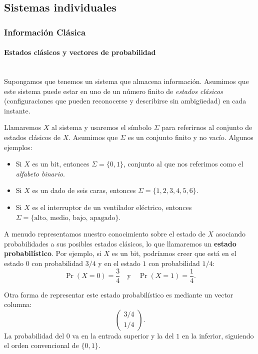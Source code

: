 \documentclass[12pt, a4paper]{article}
\begin{document}
\subsection{Sistemas individuales}
\subsubsection{Información Clásica}

\paragraph{Estados clásicos y vectores de probabilidad}\mbox{}\\

\noindent Supongamos que tenemos un sistema que almacena información. Asumimos que este sistema puede estar en uno de un número finito de \textit{estados clásicos} (configuraciones que pueden reconocerse y describirse sin ambigüedad) en cada instante.

\noindent Llamaremos $X$ al sistema y usaremos el símbolo $\Sigma$ para referirnos al conjunto de estados clásicos de $X$. Asumimos que $\Sigma$ es un conjunto finito y no vacío. Algunos ejemplos:
\begin{itemize}
    \item Si $X$ es un bit, entonces $\Sigma = \{0, 1\}$, conjunto al que nos referimos como el \textit{alfabeto binario}.
    \item Si $X$ es un dado de seis caras, entonces $\Sigma = \{1, 2, 3, 4, 5, 6\}$.
    \item Si $X$ es el interruptor de un ventilador eléctrico, entonces $\Sigma = \{\text{alto, medio, bajo, apagado}\}$.
\end{itemize}

\noindent A menudo representamos nuestro conocimiento sobre el estado de $X$ asociando probabilidades a sus posibles estados clásicos, lo que llamaremos un \textbf{estado probabilístico}. Por ejemplo, si $X$ es un bit, podríamos creer que está en el estado $0$ con probabilidad $3/4$ y en el estado $1$ con probabilidad $1/4$:
\[ \Pr(X = 0) = \frac{3}{4} \quad \text{y} \quad \Pr(X = 1) = \frac{1}{4}. \]

\noindent Otra forma de representar este estado probabilístico es mediante un vector columna:
\[ \begin{pmatrix} 3/4 \\ 1/4 \end{pmatrix}. \]
\noindent La probabilidad del $0$ va en la entrada superior y la del $1$ en la inferior, siguiendo el orden convencional de $\{0, 1\}$.
\end{document}
